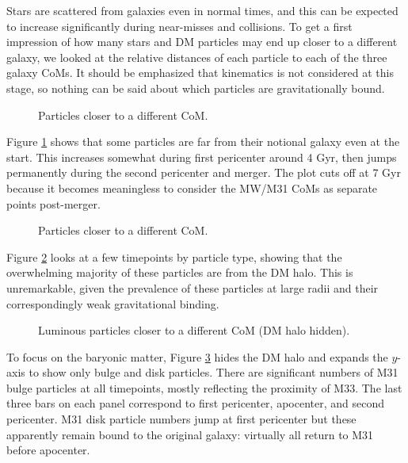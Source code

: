 \documentclass[twocolumn]{aastex63}
\begin{document}
Stars are scattered from galaxies even in normal times, and this can be expected to increase significantly during near-misses and collisions. To get a first impression of how many stars and DM particles may end up closer to a different galaxy, we looked at the relative distances of each particle to each of the three galaxy CoMs. It should be emphasized that kinematics is not considered at this stage, so nothing can be said about which particles are gravitationally bound.

\begin{figure}[htb!]
	\caption{Particles closer to a different CoM.
		\label{fig:trans_count}}
\end{figure}

Figure \ref{fig:trans_count} shows that some particles are far from their notional galaxy even at the start. This increases somewhat during first pericenter around 4 Gyr, then jumps permanently during the second pericenter and merger. The plot cuts off at 7 Gyr because it becomes meaningless to consider the MW/M31 CoMs as separate points post-merger.

\begin{figure}[htb!]
	\caption{Particles closer to a different CoM.
		\label{fig:trans_p}}
\end{figure}

Figure \ref{fig:trans_p} looks at a few timepoints by particle type, showing that the overwhelming majority of these particles are from the DM halo. This is unremarkable, given the prevalence of these particles at large radii and their correspondingly weak gravitational binding.

\begin{figure}[htb!]
	\caption{Luminous particles closer to a different CoM (DM halo hidden).
		\label{fig:trans_l}}
\end{figure}

To focus on the baryonic matter, Figure \ref{fig:trans_l} hides the DM halo and expands the $y$-axis to show only bulge and disk particles. There are significant numbers of M31 bulge particles at all timepoints, mostly reflecting the proximity of M33. The last three bars on each panel correspond to first pericenter, apocenter, and second pericenter. M31 disk particle numbers jump at first pericenter but these apparently remain bound to the original galaxy: virtually all return to M31 before apocenter.
\end{document}

